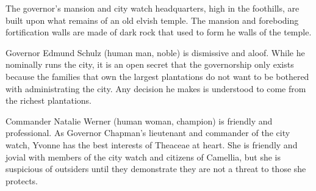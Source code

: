 The governor's mansion and city watch headquarters, high in the foothills, are built upon what remains of an old elvish temple.
The mansion and foreboding fortification walls are made of dark rock that used to form he walls of the temple.

Governor Edmund Schulz (human man, noble) is dismissive and aloof.
While he nominally runs the city, it is an open secret that the governorship only exists because the families that own the largest plantations do not want to be bothered with administrating the city.
Any decision he makes is understood to come from the richest plantations.

Commander Natalie Werner (human woman, champion) is friendly and professional.
As Governor Chapman's lieutenant and commander of the city watch, Yvonne has the best interests of Theaceae at heart.
She is friendly and jovial with members of the city watch and citizens of Camellia, but she is suspicious of outsiders until they demonstrate they are not a threat to those she protects.
